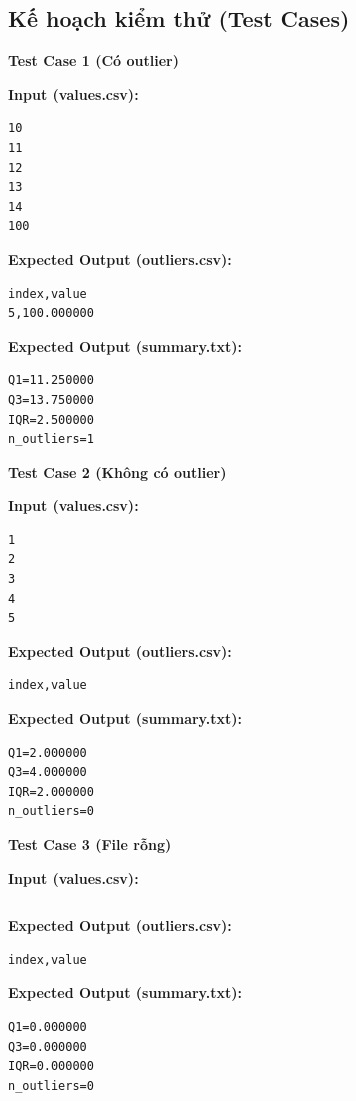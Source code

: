\subsection{Kế hoạch kiểm thử (Test Cases)}

\textbf{Test Case 1 (Có outlier)}

\textbf{Input (values.csv):}

\begin{lstlisting}
10
11
12
13
14
100
\end{lstlisting}

\textbf{Expected Output (outliers.csv):}

\begin{lstlisting}
index,value
5,100.000000
\end{lstlisting}

\textbf{Expected Output (summary.txt):}

\begin{lstlisting}
Q1=11.250000
Q3=13.750000
IQR=2.500000
n_outliers=1
\end{lstlisting}

\vspace{0.5cm}

\textbf{Test Case 2 (Không có outlier)}

\textbf{Input (values.csv):}

\begin{lstlisting}
1
2
3
4
5
\end{lstlisting}

\textbf{Expected Output (outliers.csv):}

\begin{lstlisting}
index,value
\end{lstlisting}

\textbf{Expected Output (summary.txt):}

\begin{lstlisting}
Q1=2.000000
Q3=4.000000
IQR=2.000000
n_outliers=0
\end{lstlisting}

\vspace{0.5cm}

\textbf{Test Case 3 (File rỗng)}

\textbf{Input (values.csv):}

\begin{lstlisting}

\end{lstlisting}

\textbf{Expected Output (outliers.csv):}

\begin{lstlisting}
index,value
\end{lstlisting}

\textbf{Expected Output (summary.txt):}

\begin{lstlisting}
Q1=0.000000
Q3=0.000000
IQR=0.000000
n_outliers=0
\end{lstlisting}